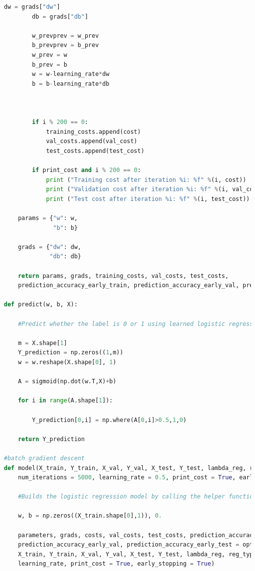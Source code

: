 \documentclass{article} %
\begin{document}
{\begin{lstlisting}[language=Python]
        dw = grads["dw"]
        db = grads["db"]
        
        w_prevprev = w_prev
        b_prevprev = b_prev
        w_prev = w
        b_prev = b
        w = w-learning_rate*dw
        b = b-learning_rate*db           
        
        

        if i % 200 == 0:
            training_costs.append(cost)
            val_costs.append(val_cost)
            test_costs.append(test_cost)
        
        if print_cost and i % 200 == 0:
            print ("Training cost after iteration %i: %f" %(i, cost))
            print ("Validation cost after iteration %i: %f" %(i, val_cost))
            print ("Test cost after iteration %i: %f" %(i, test_cost))
    
    params = {"w": w,
              "b": b}
    
    grads = {"dw": dw,
             "db": db}
    
    return params, grads, training_costs, val_costs, test_costs, 
	prediction_accuracy_early_train, prediction_accuracy_early_val, prediction_accuracy_early_test

def predict(w, b, X):

    #Predict whether the label is 0 or 1 using learned logistic regression parameters (w, b)
    
    m = X.shape[1]
    Y_prediction = np.zeros((1,m))
    w = w.reshape(X.shape[0], 1)
    
    A = sigmoid(np.dot(w.T,X)+b)
    
    for i in range(A.shape[1]):
        
        Y_prediction[0,i] = np.where(A[0,i]>0.5,1,0)
    
    return Y_prediction

#batch gradient descent
def model(X_train, Y_train, X_val, Y_val, X_test, Y_test, lambda_reg, reg_type, 
	num_iterations = 5000, learning_rate = 0.5, print_cost = True, early_stopping = True):

    #Builds the logistic regression model by calling the helper functions
    
    w, b = np.zeros((X_train.shape[0],1)), 0.
    
    parameters, grads, costs, val_costs, test_costs, prediction_accuracy_early_train, 
	prediction_accuracy_early_val, prediction_accuracy_early_test = optimize(w, b, 
	X_train, Y_train, X_val, Y_val, X_test, Y_test, lambda_reg, reg_type, num_iterations, 
	learning_rate, print_cost = True, early_stopping = True)
    

\end{lstlisting}}
\end{document}
